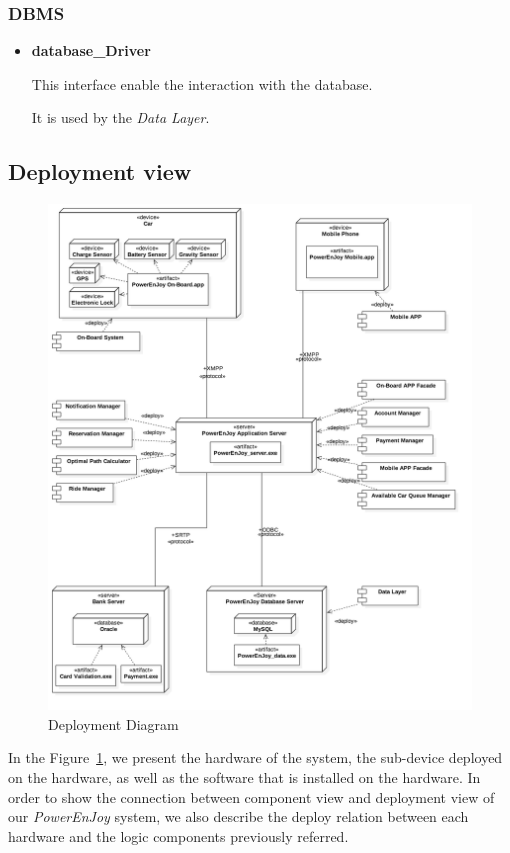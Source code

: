 \documentclass[a4paper,11pt]{article}
\begin{document}
		\subsubsection{DBMS}
			\begin{itemize}
				\item \textbf{database\_Driver}

This interface enable the interaction with the database.

It is used by the \textsl{Data Layer}. 
			\end{itemize}
			
	\subsection{Deployment view}
		\begin{figure}[H]
   			\centering
   			\includegraphics[width=\textwidth]{images/Deployment_View}
  	    		\caption{Deployment Diagram}\label{fig-deploy}
		\end{figure}

In the Figure~\ref{fig-deploy}, we present the hardware of the system, the sub-device deployed on the hardware, as well as the software that is installed on the hardware. In order to show the connection between component view and deployment view of our \textsl{PowerEnJoy} system, we also describe the deploy relation between each hardware and the logic components previously referred.
\end{document}
